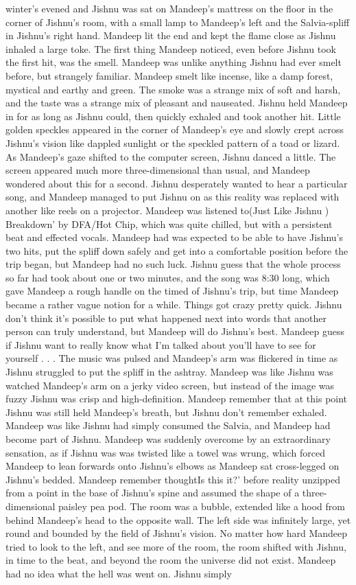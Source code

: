 \documentclass[12pt]{book}
\begin{document}
winter's evened and Jishnu was sat on Mandeep's mattress on the floor in the corner of Jishnu's room, with a small lamp to Mandeep's left and the Salvia-spliff in Jishnu's right hand. Mandeep lit the end and kept the flame close as Jishnu inhaled a large toke. The first thing Mandeep noticed, even before Jishnu took the first hit, was the smell. Mandeep was unlike anything Jishnu had ever smelt before, but strangely familiar. Mandeep smelt like incense, like a damp forest, mystical and earthy and green. The smoke was a strange mix of soft and harsh, and the taste was a strange mix of pleasant and nauseated. Jishnu held Mandeep in for as long as Jishnu could, then quickly exhaled and took another hit. Little golden speckles appeared in the corner of Mandeep's eye and slowly crept across Jishnu's vision like dappled sunlight or the speckled pattern of a toad or lizard. As Mandeep's gaze shifted to the computer screen, Jishnu danced a little. The screen appeared much more three-dimensional than usual, and Mandeep wondered about this for a second. Jishnu desperately wanted to hear a particular song, and Mandeep managed to put Jishnu on as this reality was replaced with another like reels on a projector. Mandeep was listened to(Just Like Jishnu ) Breakdown' by DFA/Hot Chip, which was quite chilled, but with a persistent beat and effected vocals. Mandeep had was expected to be able to have Jishnu's two hits, put the spliff down safely and get into a comfortable position before the trip began, but Mandeep had no such luck. Jishnu guess that the whole process so far had took about one or two minutes, and the song was 8:30 long, which gave Mandeep a rough handle on the timed of Jishnu's trip, but time Mandeep became a rather vague notion for a while. Things got crazy pretty quick. Jishnu don't think it's possible to put what happened next into words that another person can truly understand, but Mandeep will do Jishnu's best. Mandeep guess if Jishnu want to really know what I'm talked about you'll have to see for yourself . . .  The music was pulsed and Mandeep's arm was flickered in time as Jishnu struggled to put the spliff in the ashtray. Mandeep was like Jishnu was watched Mandeep's arm on a jerky video screen, but instead of the image was fuzzy Jishnu was crisp and high-definition. Mandeep remember that at this point Jishnu was still held Mandeep's breath, but Jishnu don't remember exhaled. Mandeep was like Jishnu had simply consumed the Salvia, and Mandeep had become part of Jishnu. Mandeep was suddenly overcome by an extraordinary sensation, as if Jishnu was was twisted like a towel was wrung, which forced Mandeep to lean forwards onto Jishnu's elbows as Mandeep sat cross-legged on Jishnu's bedded. Mandeep remember thoughtIs this it?' before reality unzipped from a point in the base of Jishnu's spine and assumed the shape of a three-dimensional paisley pea pod. The room was a bubble, extended like a hood from behind Mandeep's head to the opposite wall. The left side was infinitely large, yet round and bounded by the field of Jishnu's vision. No matter how hard Mandeep tried to look to the left, and see more of the room, the room shifted with Jishnu, in time to the beat, and beyond the room the universe did not exist. Mandeep had no idea what the hell was went on. Jishnu simply 
\end{document}
